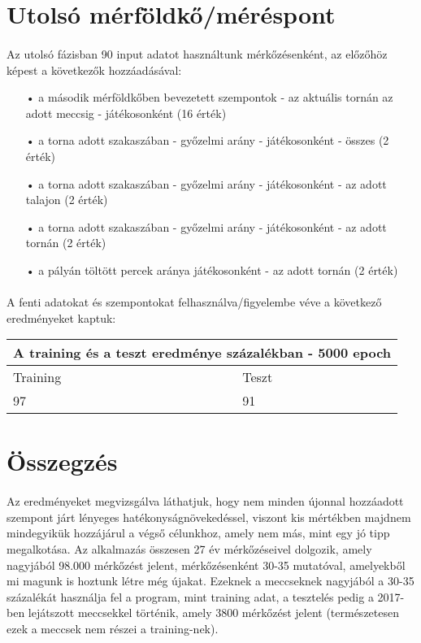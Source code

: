 \section{Utolsó mérföldkő/méréspont}\label{sec:MAT:bev}
\paragraph{}
Az utolsó fázisban 90 input adatot használtunk mérkőzésenként, az előzőhöz képest a következők hozzáadásával:
\begin{enumerate}
\item[•] a második mérföldkőben bevezetett szempontok - az aktuális tornán az adott meccsig - játékosonként (16 érték)
\item[•] a torna adott szakaszában - győzelmi arány - játékosonként - összes (2 érték)
\item[•] a torna adott szakaszában - győzelmi arány - játékosonként - az adott talajon (2 érték)
\item[•] a torna adott szakaszában - győzelmi arány - játékosonként - az adott tornán (2 érték)
\item[•] a pályán töltött percek aránya játékosonként - az adott tornán (2 érték)

\end{enumerate}

\paragraph{}
A fenti adatokat és szempontokat felhasználva/figyelembe véve a következő eredményeket kaptuk: 
\begin{center}
\begin{tabular}{ |p{4cm}|p{4cm}|  }
 \hline
 \multicolumn{2}{|c|}{A training és a teszt eredménye százalékban - 5000 epoch} \\
 \hline
  Training & Teszt\\
 \hline
 97 & 91  \\
 \hline
\end{tabular}
\end{center}

\section{Összegzés}\label{sec:MAT:bev}
\paragraph{}
Az eredményeket megvizsgálva láthatjuk, hogy nem minden újonnal hozzáadott szempont járt lényeges hatékonyságnövekedéssel, viszont kis mértékben majdnem mindegyikük hozzájárul a végső célunkhoz, amely nem más, mint egy jó tipp megalkotása. Az alkalmazás összesen 27 év mérkőzéseivel dolgozik, amely nagyjából 98.000 mérkőzést jelent, mérkőzésenként 30-35 mutatóval, amelyekből mi magunk is hoztunk létre még újakat. Ezeknek a meccseknek nagyjából a 30-35 százalékát használja fel a program, mint training adat, a tesztelés pedig a 2017-ben lejátszott meccsekkel történik, amely 3800 mérkőzést jelent (természetesen ezek a meccsek nem részei a training-nek).
